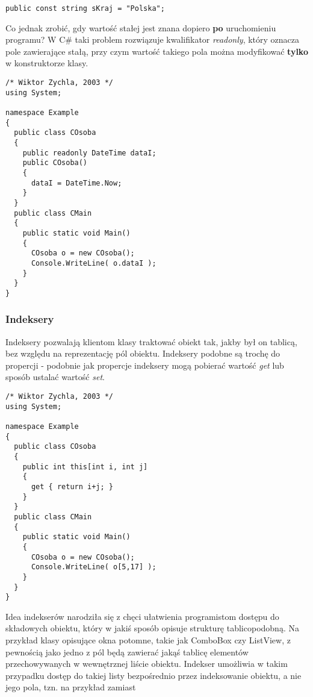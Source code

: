 \begin{scriptsize}
\begin{verbatim}
public const string sKraj = "Polska";
\end{verbatim}
\end{scriptsize}

Co jednak zrobić, gdy wartość stałej jest znana dopiero {\bf po} uruchomieniu programu? W C\# taki problem
rozwiązuje kwalifikator {\em readonly}, który oznacza pole zawierające stałą, przy czym wartość takiego
pola można modyfikować {\bf tylko} w konstruktorze klasy.

\begin{scriptsize}
\begin{verbatim}
/* Wiktor Zychla, 2003 */
using System;

namespace Example
{
  public class COsoba
  {
    public readonly DateTime dataI;
    public COsoba()
    {
      dataI = DateTime.Now;
    }
  }
  public class CMain
  {    
    public static void Main()
    {
      COsoba o = new COsoba();
      Console.WriteLine( o.dataI );
    }
  }
}
\end{verbatim}
\end{scriptsize}

\subsubsection{Indeksery}

Indeksery pozwalają klientom klasy traktować obiekt tak, jakby był on tablicą, bez względu na 
reprezentację pól obiektu. Indeksery podobne są trochę do propercji - podobnie jak propercje indeksery
mogą pobierać wartość {\em get} lub sposób ustalać wartość {\em set}.

\begin{scriptsize}
\begin{verbatim}
/* Wiktor Zychla, 2003 */
using System;

namespace Example
{
  public class COsoba
  {
    public int this[int i, int j]
    {
      get { return i+j; }
    }
  }
  public class CMain
  {    
    public static void Main()
    {
      COsoba o = new COsoba();
      Console.WriteLine( o[5,17] );
    }
  }
}
\end{verbatim}
\end{scriptsize}

Idea indekserów narodziła się z chęci ułatwienia programistom dostępu do składowych obiektu, który
w jakiś sposób opisuje strukturę tablicopodobną. Na przykład klasy opisujące okna potomne, takie jak
ComboBox czy ListView, z pewnością jako jedno z pól będą zawierać jakąś tablicę elementów przechowywanych
w wewnętrznej liście obiektu. Indekser umożliwia w takim przypadku dostęp do takiej listy bezpośrednio
przez indeksowanie obiektu, a nie jego pola, tzn. na przykład zamiast

